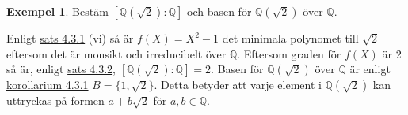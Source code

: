 \documentclass{article}
\theoremstyle{definition}
\newtheorem{exmp}[thm]{Exempel}
\begin{document}
\begin{exmp}
  Bestäm $[\mathbb{Q}(\sqrt{2}): \mathbb{\mathbb{Q}}]$ och basen för $\mathbb{Q}(\sqrt{2})$ över $\mathbb{Q}$.

  Enligt \hyperlink{minpol}{sats 4.3.1} (vi) så är $f(X) = X^2-1$ det minimala polynomet till $\sqrt{2}$ eftersom det är monsikt och irreducibelt över $\mathbb{Q}$. 
  Eftersom graden för $f(X)$ är 2 så är, enligt \hyperlink{5.3.2}{sats 4.3.2}, $[\mathbb{Q}(\sqrt{2}): \mathbb{\mathbb{Q}}] = 2.$ Basen för $\mathbb{Q}(\sqrt{2})$ över $\mathbb{Q}$
  är enligt \hyperlink{kol5.3.1}{korollarium 4.3.1} $B = \{1, \sqrt{2}\}$. Detta betyder att varje element i $\mathbb{Q}(\sqrt{2})$ kan uttryckas 
  på formen $a + b\sqrt{2}$ för $a, b \in \mathbb{Q}.$

\end{exmp}

  

\end{document}
